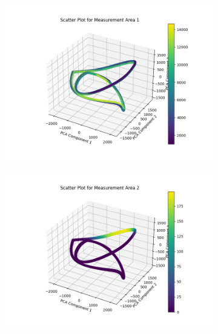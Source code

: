 \begin{itemize}
\begin{figure}[H]
\centering
    \begin{subfigure}{0.3\textwidth}
        \includegraphics[width=\linewidth]
        {images/task5_2_1.png}
        \label{task5_2_1}
    \end{subfigure}
    \begin{subfigure}{0.3\textwidth}
        \includegraphics[width=\linewidth]
        {images/task5_2_2.png}
        \label{task5_2_2}
    \end{subfigure}
    \begin{subfigure}{0.33\textwidth}

\end{subfigure}
\end{figure}
\end{itemize}
